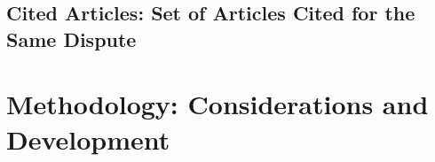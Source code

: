 \documentclass[12pt,letterpaper]{article}
\begin{document}
\subsection{Cited Articles: Set of Articles Cited for the Same Dispute}


\section{Methodology: Considerations and Development} \label{sec:methods}


%  

% 

\end{document}
